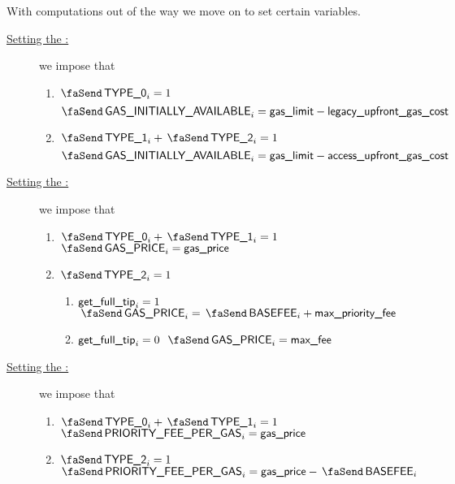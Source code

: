 \begin{center}
\end{center}
With computations out of the way we move on to set certain variables.
\begin{description}
        \item[\underline{Setting the \txInitialGas:}] 
                we impose that
                \begin{enumerate}
                        \item \If $\txIsLegacy _{i} = 1$ \Then
                                \[ \txInitialGas  _{i} = \locGasLimit - \locLegacyUpfrontGasCost \]
                        \item \If $\txIsAccessSet _{i} + \txIsTypeTwo _{i} = 1$ \Then
                                \[ \txInitialGas  _{i} = \locGasLimit - \locAccessUpfrontGasCost \]
                \end{enumerate}
        \item[\underline{Setting the \txGasPrice:}] 
                we impose that
                \begin{enumerate}
                        \item \If $\txIsLegacy _{i} + \txIsAccessSet _{i} = 1$ \Then $\txGasPrice  _{i} = \locGasPrice$
                        \item \If $\txIsTypeTwo_{i} = 1$ \Then
                                \begin{enumerate}
                                        \item \If $\textsf{get\_full\_tip}_{i} = 1$ \Then $\txGasPrice  _{i} = \txBasefee_{i} + \locMaxPriorityFee$
                                        \item \If $\textsf{get\_full\_tip}_{i} = 0$ \Then $\txGasPrice  _{i} = \locMaxFee$
                                \end{enumerate}
                \end{enumerate}
        \item[\underline{Setting the \txPriorityFeePerGas:}] 
                we impose that
                \begin{enumerate}
                        \item \If $\txIsLegacy _{i} + \txIsAccessSet _{i} = 1$ \Then $\txPriorityFeePerGas  _{i} = \locGasPrice$
                        \item \If $\txIsTypeTwo_{i} = 1$ \Then $\txPriorityFeePerGas  _{i} = \locGasPrice - \txBasefee_{i}$

\end{enumerate}
\end{description}
